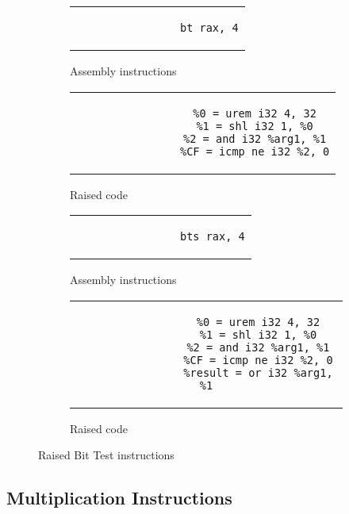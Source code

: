 \begin{figure}[htpb]
    \centering
    \begin{subfigure}{.45\textwidth}
        \begin{tabular}{c}
            \begin{lstlisting}
                bt rax, 4
            \end{lstlisting}
        \end{tabular}
        \caption{Assembly instructions}
    \end{subfigure}
    \hfill%
    \begin{subfigure}{.45\textwidth}
        \begin{tabular}{c}
            \begin{lstlisting}
                %0 = urem i32 4, 32
                %1 = shl i32 1, %0
                %2 = and i32 %arg1, %1
                %CF = icmp ne i32 %2, 0
            \end{lstlisting}
        \end{tabular}
        \caption{Raised code}
    \end{subfigure}

    \begin{subfigure}{.45\textwidth}
        \begin{tabular}{c}
            \begin{lstlisting}
                bts rax, 4
            \end{lstlisting}
        \end{tabular}
        \caption{Assembly instructions}
    \end{subfigure}
    \hfill%
    \begin{subfigure}{.45\textwidth}
        \begin{tabular}{c}
            \begin{lstlisting}
                %0 = urem i32 4, 32
                %1 = shl i32 1, %0
                %2 = and i32 %arg1, %1
                %CF = icmp ne i32 %2, 0
                %result = or i32 %arg1, %1
            \end{lstlisting}
        \end{tabular}
        \caption{Raised code}
    \end{subfigure}
    \caption{Raised Bit Test instructions}
    \label{fig:raised-bt}
\end{figure}

\subsection{Multiplication Instructions}\label{subsec:multiplication-instructions}

